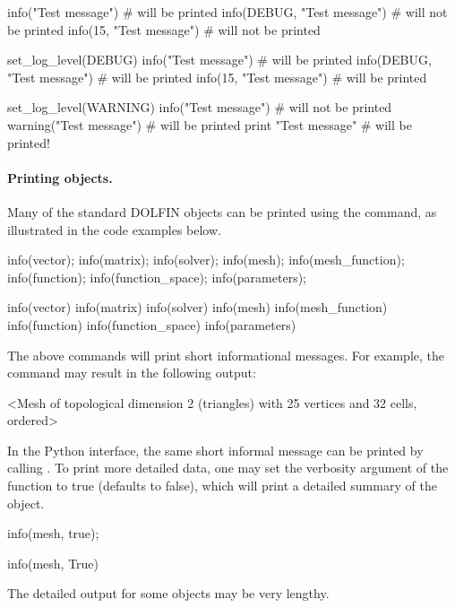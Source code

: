 \begin{python}
info("Test message")                       # will be printed
info(DEBUG, "Test message")                # will not be printed
info(15, "Test message")                   # will not be printed

set_log_level(DEBUG)
info("Test message")                       # will be printed
info(DEBUG, "Test message")                # will be printed
info(15, "Test message")                   # will be printed

set_log_level(WARNING)
info("Test message")                       # will not be printed
warning("Test message")                    # will be printed
print "Test message"                       # will be printed!
\end{python}

\paragraph{Printing objects.}

Many of the standard DOLFIN objects can be printed using the 
command, as illustrated in the code examples below.
\begin{c++}
info(vector);
info(matrix);
info(solver);
info(mesh);
info(mesh_function);
info(function);
info(function_space);
info(parameters);
\end{c++}
\begin{python}
info(vector)
info(matrix)
info(solver)
info(mesh)
info(mesh_function)
info(function)
info(function_space)
info(parameters)
\end{python}
The above commands will print short informational messages. For example,
the command  may result in the following output:
\begin{gencode}
<Mesh of topological dimension 2 (triangles) with 25 vertices and 32 cells, ordered>
\end{gencode}
In the Python interface, the same short informal message can be printed
by calling . To print more detailed data, one may
set the verbosity argument of the  function to true (defaults
to false), which will print a detailed summary of the object.
\begin{c++}
info(mesh, true);
\end{c++}
\begin{python}
info(mesh, True)
\end{python}
The detailed output for some objects may be very lengthy.

